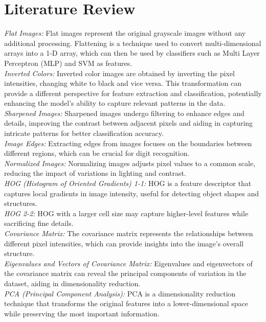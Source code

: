 \documentclass{article}
\begin{document}
\section{Literature Review} 

\emph{Flat Images:} Flat images represent the original grayscale images without any additional processing. Flattening is a technique used to convert multi-dimensional arrays into a 1-D array, which can then be used by classifiers such as Multi Layer Perceptron (MLP) and SVM as features.
\\
\emph{Inverted Colors:} Inverted color images are obtained by inverting the pixel intensities, changing white to black and vice versa. This transformation can provide a different perspective for feature extraction and classification, potentially enhancing the model's ability to capture relevant patterns in the data.
\\
\emph{Sharpened Images:} Sharpened images undergo filtering to enhance edges and details, improving the contrast between adjacent pixels and aiding in capturing intricate patterns for better classification accuracy.
\\
\emph{Image Edges:} Extracting edges from images focuses on the boundaries between different regions, which can be crucial for digit recognition.
\\
\emph{Normalized Images:} Normalizing images adjusts pixel values to a common scale, reducing the impact of variations in lighting and contrast.
\\
\emph{HOG (Histogram of Oriented Gradients) 1-1:} HOG is a feature descriptor that captures local gradients in image intensity, useful for detecting object shapes and structures.
\\
\emph{HOG 2-2:} HOG with a larger cell size may capture higher-level features while sacrificing fine details.
\\
\emph{Covariance Matrix:} The covariance matrix represents the relationships between different pixel intensities, which can provide insights into the image's overall structure.
\\
\emph{Eigenvalues and Vectors of Covariance Matrix:} Eigenvalues and eigenvectors of the covariance matrix can reveal the principal components of variation in the dataset, aiding in dimensionality reduction.
\\
\emph{PCA (Principal Component Analysis):} PCA is a dimensionality reduction technique that transforms the original features into a lower-dimensional space while preserving the most important information.
\end{document}
